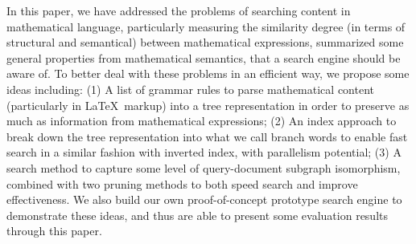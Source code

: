 In this paper, we have addressed the problems of searching content in mathematical language, particularly measuring the similarity degree (in terms of structural and semantical) between mathematical expressions, summarized some general properties from mathematical semantics, that a search engine should be aware of. To better deal with these problems in an efficient way, we propose some ideas including: 
(1) A list of grammar rules to parse mathematical content (particularly in \LaTeX \ markup) into a tree representation in order to preserve as much as information from mathematical expressions; 
(2) An index approach to break down the tree representation into what we call branch words to enable fast search in a similar fashion with inverted index, with parallelism potential; 
(3) A search method to capture some level of query-document subgraph isomorphism, combined with two pruning methods to both speed search and improve effectiveness. 
We also build our own proof-of-concept prototype search engine to demonstrate these ideas, and thus are able to present some evaluation results through this paper.
